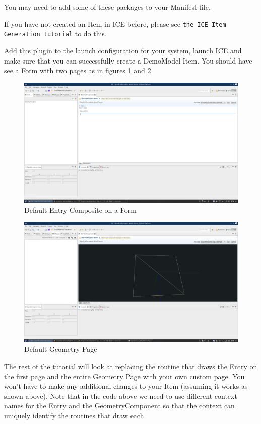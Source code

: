 You may need to add some of these packages to your Manifest file.

If you have not created an Item in ICE before, please see \texttt{the ICE Item
Generation tutorial} to do this.

Add this plugin to the launch configuration for your system, launch ICE and
make sure that you can successfully create a DemoModel Item. You should have
see a Form with two pages as in figures \ref{fig:iceDefaultEntryPage} and
\ref{fig:iceDefaultGeometryPage}.

\begin{figure}[h]
\includegraphics[width=\textwidth]{pics/dynamicUI_defaultEntryPage.png}
\caption{Default Entry Composite on a Form}
\label{fig:iceDefaultEntryPage}
\end{figure}

\begin{figure}[h]
\includegraphics[width=\textwidth]{pics/dynamicUI_defaultGeometryPage.png}
\caption{Default Geometry Page}
\label{fig:iceDefaultGeometryPage}
\end{figure}

The rest of the tutorial will look at replacing the routine that draws the
Entry on the first page and the entire Geometry Page with your own custom page.
You won’t have to make any additional changes to your Item (assuming it works
as shown above). Note that in the code above we need to use different context
names for the Entry and the GeometryComponent so that the context can uniquely
identify the routines that draw each.

